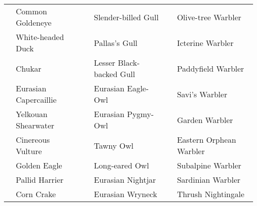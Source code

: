 \documentclass{article}
\begin{document}
\begin{center}
\begin{tabularx}{\textwidth}{cXcXcX}
\underline{\hspace{3ex}} 	 &Common Goldeneye 	 &\underline{\hspace{3ex}} 	 &Slender-billed Gull 	 &\underline{\hspace{3ex}} 	 &Olive-tree Warbler \\ 
\underline{\hspace{3ex}} 	 &White-headed Duck 	 &\underline{\hspace{3ex}} 	 &Pallas's Gull 	 &\underline{\hspace{3ex}} 	 &Icterine Warbler \\ 
\underline{\hspace{3ex}} 	 &Chukar 	 &\underline{\hspace{3ex}} 	 &Lesser Black-backed Gull 	 &\underline{\hspace{3ex}} 	 &Paddyfield Warbler \\ 
\underline{\hspace{3ex}} 	 &Eurasian Capercaillie 	 &\underline{\hspace{3ex}} 	 &Eurasian Eagle-Owl 	 &\underline{\hspace{3ex}} 	 &Savi's Warbler \\ 
\underline{\hspace{3ex}} 	 &Yelkouan Shearwater 	 &\underline{\hspace{3ex}} 	 &Eurasian Pygmy-Owl 	 &\underline{\hspace{3ex}} 	 &Garden Warbler \\ 
\underline{\hspace{3ex}} 	 &Cinereous Vulture 	 &\underline{\hspace{3ex}} 	 &Tawny Owl 	 &\underline{\hspace{3ex}} 	 &Eastern Orphean Warbler \\ 
\underline{\hspace{3ex}} 	 &Golden Eagle 	 &\underline{\hspace{3ex}} 	 &Long-eared Owl 	 &\underline{\hspace{3ex}} 	 &Subalpine Warbler \\ 
\underline{\hspace{3ex}} 	 &Pallid Harrier 	 &\underline{\hspace{3ex}} 	 &Eurasian Nightjar 	 &\underline{\hspace{3ex}} 	 &Sardinian Warbler \\ 
\underline{\hspace{3ex}} 	 &Corn Crake 	 &\underline{\hspace{3ex}} 	 &Eurasian Wryneck 	 &\underline{\hspace{3ex}} 	 &Thrush Nightingale \\ 

\end{tabularx}
\end{center}
\end{document}

